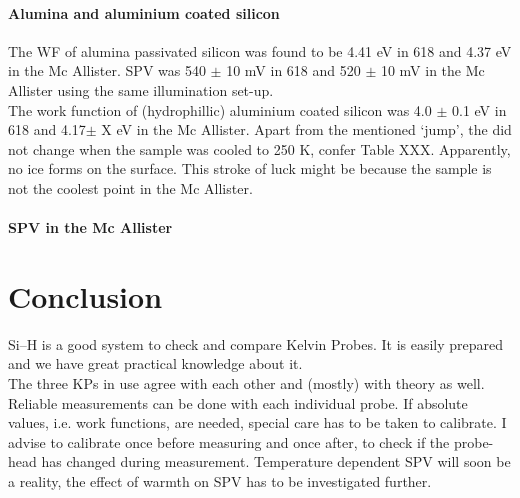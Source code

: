 \documentclass[a4paper,10pt]{article}
\newcommand{\sih}{Si--H}
\newcommand{\cpd}{\text{CPD}}
\newcommand{\McA}{Mc Allister}
\newcommand{\kp}{KP}
\newcommand{\spv}{SPV}
\newcommand{\ie}{i.e.}
\newcommand{\wf}{WF}
\begin{document}
\paragraph{Alumina and aluminium coated silicon}
The \wf{} of alumina passivated silicon was found to be 4.41 eV in 618 and 4.37 eV in the \McA{}. \spv{} was 540 $\pm$ 10 mV in 618 and 520 $\pm$ 10 mV in the \McA{} using the same illumination set-up.\\
The work function of  (hydrophillic) aluminium coated silicon was 4.0 $\pm$ 0.1 eV in 618 and 4.17$\pm$ X eV in the \McA{}. Apart from the mentioned \lq{}jump\rq{}, the \cpd{} did not change when the sample was cooled to 250 K, confer Table XXX. Apparently, no ice forms on the surface. This stroke of luck might be because the sample is not the coolest point in the \McA{}.
\paragraph{\spv{} in the \McA{}}


\section{Conclusion}
\sih{} is a good system to check and compare Kelvin Probes. It is easily prepared and we have great practical knowledge about it.\\
The three \kp{}s in use agree with each other and (mostly) with theory as well. Reliable measurements can be done with each individual probe. If absolute values, \ie{} work functions, are needed, special care has to be taken to calibrate. I advise to calibrate once before measuring and once after, to check if the probe-head has changed during measurement. Temperature dependent \spv{} will soon be a reality, the effect of warmth on \spv{} has to be investigated further.
\end{document}
